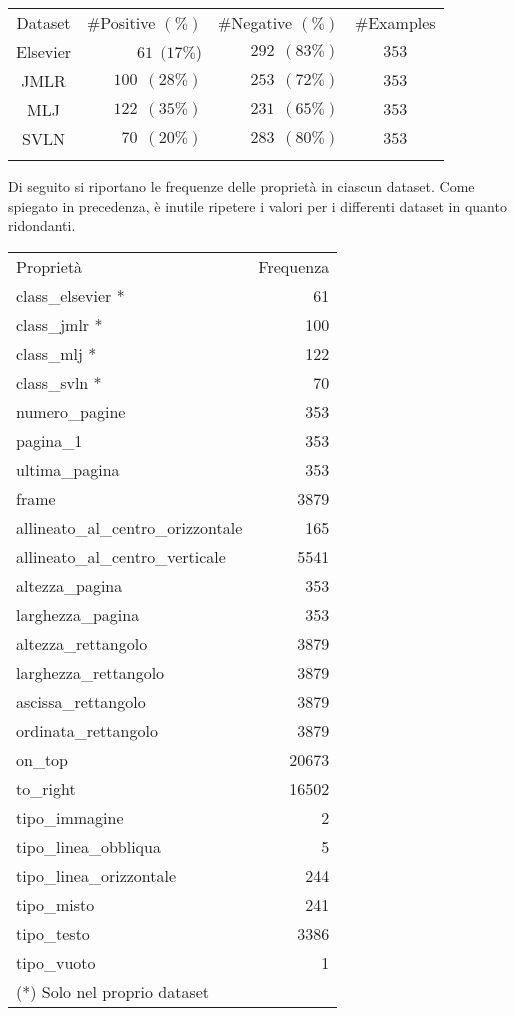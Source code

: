 \begin{table}[H]
	\label{tab:datasets}
	\centering
\begin{tabular}{c@{\qquad}r@{\qquad}r@{\qquad}c}
\toprule
\addlinespace
Dataset & \#Positive $(\%)$ & \#Negative $(\%)$ & \#Examples \\
\addlinespace
\midrule
\addlinespace
Elsevier & $61~~(17\%$) & $292~~(83\%)$ & $353$ \\
JMLR     & $100~~(28\%)$ & $253~~(72\%)$ & $353$ \\
MLJ      & $122~~(35\%)$ & $231~~(65\%)$ & $353$ \\
SVLN     & $70~~(20\%)$ & $283~~(80\%)$ & $353$ \\
\addlinespace
\bottomrule
\end{tabular}
\end{table}

Di seguito si riportano le frequenze delle proprietà in ciascun dataset. Come spiegato in precedenza, è inutile ripetere i valori per i differenti dataset in quanto ridondanti.

\begin{table}[H]
\centering
\label{tab:frequenzaProprietà}
\small\begin{tabular}{lr}
\toprule
\addlinespace
Proprietà & Frequenza \\
\addlinespace
\midrule
\addlinespace
class\_elsevier * & 61 \\
class\_jmlr * & 100 \\
class\_mlj * & 122 \\
class\_svln * & 70 \\
numero\_pagine & 353 \\
pagina\_1 & 353 \\
ultima\_pagina & 353 \\
frame & 3879 \\
allineato\_al\_centro\_orizzontale & 165 \\
allineato\_al\_centro\_verticale & 5541 \\
altezza\_pagina & 353 \\
larghezza\_pagina & 353 \\
altezza\_rettangolo & 3879 \\
larghezza\_rettangolo & 3879 \\
ascissa\_rettangolo & 3879 \\
ordinata\_rettangolo & 3879 \\
on\_top & 20673 \\
to\_right & 16502 \\
tipo\_immagine & 2 \\
tipo\_linea\_obbliqua & 5 \\
tipo\_linea\_orizzontale & 244 \\
tipo\_misto & 241 \\
tipo\_testo & 3386 \\
tipo\_vuoto & 1 \\
\addlinespace
\bottomrule
\addlinespace
(*) Solo nel proprio dataset & \\
\end{tabular}
\end{table}



